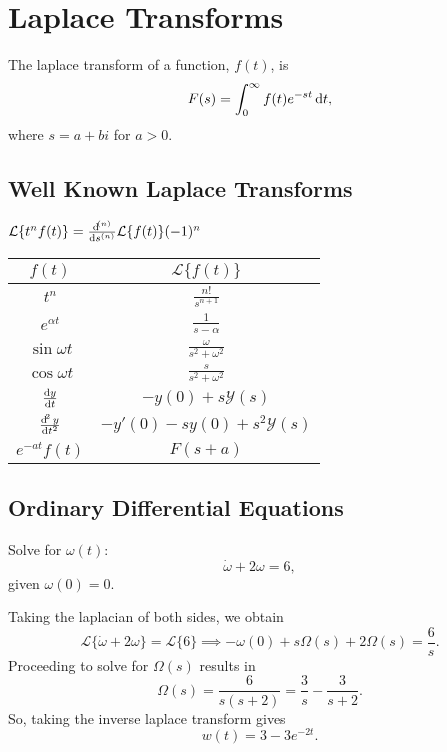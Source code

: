 \chapter{Laplace Transforms}

The \alert{laplace transform} of a function, $f(t)$, is 
$$F(s) = \int_0^{\infty} f(t)e^{-st} \dif t,$$ where $s = a + bi$ for $a > 0$.

\section{Well Known Laplace Transforms}

$\mathcal{L}\{t^nf(t)\} = \frac{\dif^{(n)}}{\dif s ^ {(n)}}\mathcal{L}\{f(t)\}(-1)^n$

\begin{center}
    \begin{tabular}{| c | c |}
        \hline
        $f(t)$ & $\mathcal{L}\{f(t)\}$ \\
        \hline
        $t^n$ & $\frac{n!}{s^{n+1}}$ \\
        $e^{\alpha t}$ & $\frac{1}{s-\alpha}$ \\
        $\sin \omega t$ & $\frac{\omega}{s^2+\omega^2}$ \\
        $\cos \omega t$ & $\frac{s}{s^2+\omega^2}$ \\
        $\frac{\dif y}{\dif t}$ & $-y(0)+s\mathcal{Y}(s)$ \\
        $\frac{\dif^2 y}{\dif t^2}$ & $-y'(0)-sy(0)+s^2\mathcal{Y}(s)$ \\
        $e^{-at}f(t)$ & $F(s+a)$ \\
        \hline
    \end{tabular}
\end{center}

\section{Ordinary Differential Equations}

\begin{example}
    Solve for $\omega(t)$: 
    $$\dot{\omega}+2\omega = 6,$$
    given $\omega(0) = 0$.
\end{example}
\begin{soln}
    Taking the laplacian of both sides, we obtain
    $$\mathcal{L} \{ \dot{\omega}+2\omega \} = \mathcal{L} \{6\}
    \implies -\omega(0) + s\Omega(s)+2\Omega(s) = \frac{6}{s}.$$
    Proceeding to solve for $\Omega(s)$ results in
    $$\Omega(s) = \frac{6}{s(s+2)} = \frac{3}{s} - \frac{3}{s+2}.$$
    So, taking the inverse laplace transform gives
    $$w(t) = 3-3e^{-2t}.$$
\end{soln}

